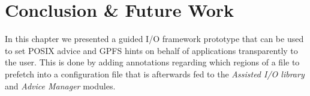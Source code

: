 \section{Conclusion \& Future Work}
\label{sec: mercury_conclusion}

In this chapter we presented a guided I/O framework prototype that can be used to set POSIX advice and GPFS hints on behalf of applications transparently to the user. This is done by adding annotations regarding which regions of a file to prefetch into a configuration file that is afterwards fed to the \textit{Assisted I/O library} and \textit{Advice Manager} modules. %

 
